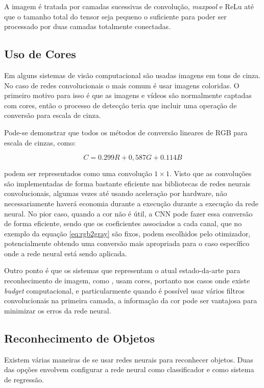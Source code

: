 A imagem é tratada por camadas sucessivas de convolução, \emph{maxpool} e
ReLu até que
o tamanho total do tensor seja pequeno o suficiente para poder ser processado
por duas camadas totalmente conectadas. 

\subsection{Uso de Cores}
Em alguns sistemas de visão computacional são usadas imagens em
tons de cinza. No caso de redes convolucionais o mais comum é usar
imagens coloridas.
O primeiro motivo para isso é que as imagens e vídeos são normalmente
captadas com cores, então o processo de detecção teria que incluir uma operação
de conversão para escala de cinza. 

Pode-se demonstrar que todos os métodos de conversão lineares de RGB para
escala de cinzas, como:

\begin{equation} \label{eq:rgb2gray}
	C=0.299R + 0,587G + 0.114B
\end{equation}

podem ser representados como uma convolução $1 \times 1$. Visto que as
convoluções são implementadas de forma bastante eficiente nas bibliotecas
de redes neurais convolucionais, algumas vezes até usando aceleração por
hardware, não necessariamente haverá economia durante a execução
durante a execução da rede neural. No pior caso, quando a cor não
é útil, a CNN pode fazer
essa conversão de forma eficiente, sendo que os coeficientes associados
a cada canal, que no exemplo da equação \ref{eq:rgb2gray} são fixos, podem
escolhidos pelo otimizador, potencialmente obtendo uma conversão mais
apropriada para o caso específico onde a rede neural está sendo aplicada.

Outro ponto é que os sistemas que representam o atual
estado-da-arte para reconhecimento de imagem, como \cite{szegedy2015going}
\cite{hasanpour2016lets}, usam cores, portanto nos casos onde
existe \emph{budget} computacional, e particularmente quando é possível usar
vários filtros convolucionais na primeira camada, a informação da cor pode
ser vantajosa para minimizar os erros da rede neural.

\subsection{Reconhecimento de Objetos}
Existem várias maneiras de se usar redes neurais para reconhecer objetos. Duas
das opções envolvem configurar a rede neural como classificador e como
sistema de regressão.

